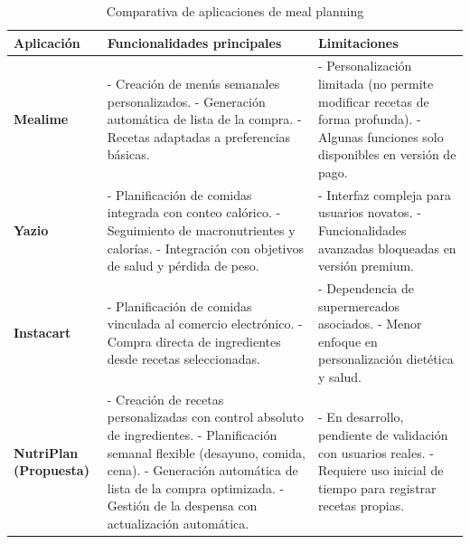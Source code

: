 \documentclass[12pt,a4paper]{report} %
\begin{document}
	\begin{table}[H]
		\centering

		\begin{tabular}{|p{3cm}|p{5cm}|p{5cm}|}
			\hline
			\textbf{Aplicación} & \textbf{Funcionalidades principales} & \textbf{Limitaciones} \\ \hline
			
			\textbf{Mealime} & 
			- Creación de menús semanales personalizados. \newline
			- Generación automática de lista de la compra. \newline
			- Recetas adaptadas a preferencias básicas. & 
			- Personalización limitada (no permite modificar recetas de forma profunda). \newline
			- Algunas funciones solo disponibles en versión de pago. \\ \hline
			
			\textbf{Yazio} & 
			- Planificación de comidas integrada con conteo calórico. \newline
			- Seguimiento de macronutrientes y calorías. \newline
			- Integración con objetivos de salud y pérdida de peso. & 
			- Interfaz compleja para usuarios novatos. \newline
			- Funcionalidades avanzadas bloqueadas en versión premium. \\ \hline
			
			\textbf{Instacart} & 
			- Planificación de comidas vinculada al comercio electrónico. \newline
			- Compra directa de ingredientes desde recetas seleccionadas. & 
			- Dependencia de supermercados asociados. \newline
			- Menor enfoque en personalización dietética y salud. \\ \hline
			
			\textbf{NutriPlan (Propuesta)} & 
			- Creación de recetas personalizadas con control absoluto de ingredientes. \newline
			- Planificación semanal flexible (desayuno, comida, cena). \newline
			- Generación automática de lista de la compra optimizada. \newline
			- Gestión de la despensa con actualización automática. & 
			- En desarrollo, pendiente de validación con usuarios reales. \newline
			- Requiere uso inicial de tiempo para registrar recetas propias. \\ \hline

		\end{tabular}			
		\caption{Comparativa de aplicaciones de meal planning}
		\label{tab:comparativa_apps}
	\end{table}
	
\end{document}
